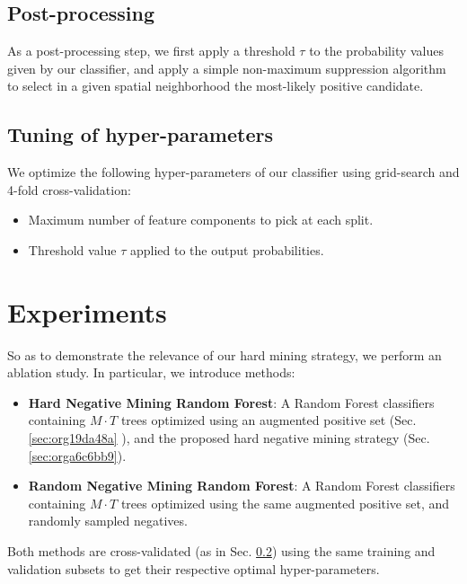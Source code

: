 \documentclass[11pt]{article}
\begin{document}
\subsection{Post-processing}
\label{sec:org361ad63}

As a post-processing step, we first apply a threshold \(\tau\) to the probability values given
by our classifier,
and apply a simple non-maximum suppression algorithm to select
in a given spatial neighborhood
the most-likely positive candidate.

\subsection{Tuning of hyper-parameters}
\label{sec:org5b9dad3}

We optimize the following hyper-parameters of our classifier using grid-search and 4-fold cross-validation:

\begin{itemize}
\item Maximum number of feature components to pick at each split.
\item Threshold value \(\tau\) applied to the output probabilities.
\end{itemize}

\section{Experiments}
\label{sec:orge305a31}

So as to demonstrate the relevance of our hard mining strategy, we perform an ablation study.
In particular, we introduce methods:

\begin{itemize}
\item \textbf{Hard Negative Mining Random Forest}: A Random Forest classifiers containing \(M \cdot T\) trees
optimized using an augmented positive set (Sec. \ref{sec:org19da48a} ), and the proposed hard negative mining strategy (Sec. \ref{sec:orga6c6bb9}).
\item \textbf{Random Negative Mining Random Forest}: A Random Forest classifiers containing \(M \cdot T\) trees
optimized using the same augmented positive set, and randomly sampled negatives.
\end{itemize}

Both methods are cross-validated (as in Sec. \ref{sec:org5b9dad3}) using the same training and validation subsets to get their respective
optimal hyper-parameters.
\end{document}
